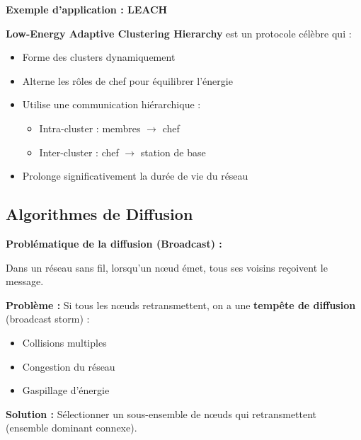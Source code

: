 \documentclass[12pt,a4paper]{article}
\begin{document}
\begin{exemple}
\textbf{Exemple d'application : LEACH}

\textbf{Low-Energy Adaptive Clustering Hierarchy} est un protocole célèbre qui :
\begin{itemize}
    \item Forme des clusters dynamiquement
    \item Alterne les rôles de chef pour équilibrer l'énergie
    \item Utilise une communication hiérarchique :
    \begin{itemize}
        \item Intra-cluster : membres $\to$ chef
        \item Inter-cluster : chef $\to$ station de base
    \end{itemize}
    \item Prolonge significativement la durée de vie du réseau
\end{itemize}
\end{exemple}

\newpage
\subsection{Algorithmes de Diffusion}

\begin{notecours}
\textbf{Problématique de la diffusion (Broadcast) :}

Dans un réseau sans fil, lorsqu'un nœud émet, tous ses voisins reçoivent le message.

\textbf{Problème :} Si tous les nœuds retransmettent, on a une \textcolor{importantrouge}{\textbf{tempête de diffusion}} (broadcast storm) :
\begin{itemize}
    \item Collisions multiples
    \item Congestion du réseau
    \item Gaspillage d'énergie
\end{itemize}

\textbf{Solution :} Sélectionner un sous-ensemble de nœuds qui retransmettent (ensemble dominant connexe).
\end{notecours}
\end{document}
